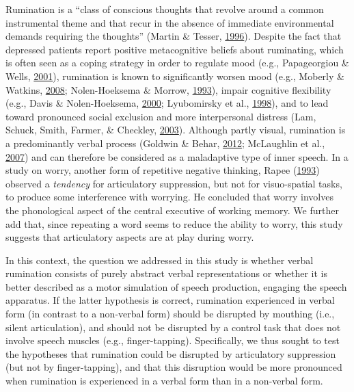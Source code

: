 \documentclass[a4paper,12pt,twoside,openright,oldfontcommands]{memoir}
\begin{document}
Rumination is a \enquote{class of conscious thoughts that revolve around a common instrumental theme and that recur in the absence of immediate environmental demands requiring the thoughts} (Martin \& Tesser, \protect\hyperlink{ref-Martin}{1996}). Despite the fact that depressed patients report positive metacognitive beliefs about ruminating, which is often seen as a coping strategy in order to regulate mood (e.g., Papageorgiou \& Wells, \protect\hyperlink{ref-papageorgiou_metacognitive_2001}{2001}), rumination is known to significantly worsen mood (e.g., Moberly \& Watkins, \protect\hyperlink{ref-Moberly2008}{2008}; Nolen-Hoeksema \& Morrow, \protect\hyperlink{ref-nolen-hoeksema_effects_1993}{1993}), impair cognitive flexibility (e.g., Davis \& Nolen-Hoeksema, \protect\hyperlink{ref-Davis2000}{2000}; Lyubomirsky et al., \protect\hyperlink{ref-Lyubomirsky1998}{1998}), and to lead toward pronounced social exclusion and more interpersonal distress (Lam, Schuck, Smith, Farmer, \& Checkley, \protect\hyperlink{ref-lam_response_2003}{2003}). Although partly visual, rumination is a predominantly verbal process (Goldwin \& Behar, \protect\hyperlink{ref-goldwin_concreteness_2012}{2012}; McLaughlin et al., \protect\hyperlink{ref-mclaughlin_effects_2007}{2007}) and can therefore be considered as a maladaptive type of inner speech. In a study on worry, another form of repetitive negative thinking, Rapee (\protect\hyperlink{ref-rapee_utilisation_1993}{1993}) observed a \emph{tendency} for articulatory suppression, but not for visuo-spatial tasks, to produce some interference with worrying. He concluded that worry involves the phonological aspect of the central executive of working memory. We further add that, since repeating a word seems to reduce the ability to worry, this study suggests that articulatory aspects are at play during worry.

In this context, the question we addressed in this study is whether verbal rumination consists of purely abstract verbal representations or whether it is better described as a motor simulation of speech production, engaging the speech apparatus. If the latter hypothesis is correct, rumination experienced in verbal form (in contrast to a non-verbal form) should be disrupted by mouthing (i.e., silent articulation), and should not be disrupted by a control task that does not involve speech muscles (e.g., finger-tapping). Specifically, we thus sought to test the hypotheses that rumination could be disrupted by articulatory suppression (but not by finger-tapping), and that this disruption would be more pronounced when rumination is experienced in a verbal form than in a non-verbal form.
\end{document}
